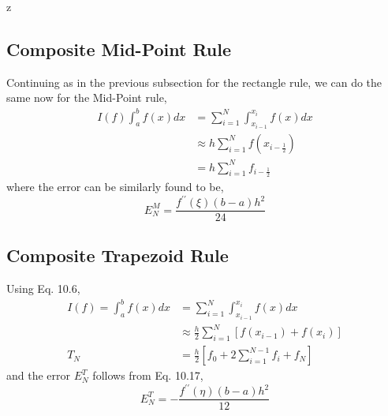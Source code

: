 z\documentclass[a4paper,12pt,twoside]{book}
\begin{document}
\subsection{Composite Mid-Point Rule}
Continuing as in the previous subsection for the rectangle rule, we can do the same now for the Mid-Point rule,
\begin{equation}
\begin{split}
   I(f) \int_a^b f(x)dx &= \sum_{i=1}^N \int_{x_{i-1}}^{x_i} f(x)dx\\
    &\approx h \sum_{i=1}^N f(x_{i-\frac{1}{2}}) \\
    &= \boxed{h\sum_{i=1}^Nf_{i-\frac{1}{2}}}
\end{split}
\end{equation}
where the error can be similarly found to be,
\begin{equation}
        E_N^M = \frac{f^{\prime\prime}(\xi)(b-a)h^2}{24}
\end{equation}
\subsection{Composite Trapezoid Rule}
Using Eq. 10.6,
\begin{equation}
    \begin{split}
        I(f) = \int_a^bf(x)dx &= \sum_{i=1}^N \int_{x_{i-1}}^{x_i}f(x)dx\\
        &\approx \frac{h}{2} \sum_{i=1}^N[f(x_{i-1}) + f(x_i)]\\
       T_N &= \boxed{\frac{h}{2} \left[ f_0 + 2\sum_{i=1}^{N-1}f_i + f_N \right]}
    \end{split}
\end{equation}
and the error $E^T_N$ follows from Eq. 10.17,
\begin{equation}
    E_N^T = -\frac{f^{\prime\prime}(\eta)(b-a)h^2}{12}
\end{equation}
\end{document}
